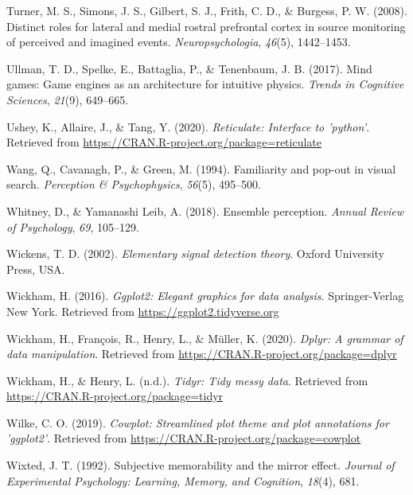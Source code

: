 \documentclass[12pt,twoside]{reedthesis}
\begin{document}
\leavevmode\hypertarget{ref-turner2008distinct}{}%
Turner, M. S., Simons, J. S., Gilbert, S. J., Frith, C. D., \& Burgess, P. W. (2008). Distinct roles for lateral and medial rostral prefrontal cortex in source monitoring of perceived and imagined events. \emph{Neuropsychologia}, \emph{46}(5), 1442--1453.

\leavevmode\hypertarget{ref-ullman2017mind}{}%
Ullman, T. D., Spelke, E., Battaglia, P., \& Tenenbaum, J. B. (2017). Mind games: Game engines as an architecture for intuitive physics. \emph{Trends in Cognitive Sciences}, \emph{21}(9), 649--665.

\leavevmode\hypertarget{ref-R-reticulate}{}%
Ushey, K., Allaire, J., \& Tang, Y. (2020). \emph{Reticulate: Interface to 'python'}. Retrieved from \url{https://CRAN.R-project.org/package=reticulate}

\leavevmode\hypertarget{ref-wang1994familiarity}{}%
Wang, Q., Cavanagh, P., \& Green, M. (1994). Familiarity and pop-out in visual search. \emph{Perception \& Psychophysics}, \emph{56}(5), 495--500.

\leavevmode\hypertarget{ref-whitney2018ensemble}{}%
Whitney, D., \& Yamanashi Leib, A. (2018). Ensemble perception. \emph{Annual Review of Psychology}, \emph{69}, 105--129.

\leavevmode\hypertarget{ref-wickens2002elementary}{}%
Wickens, T. D. (2002). \emph{Elementary signal detection theory}. Oxford University Press, USA.

\leavevmode\hypertarget{ref-R-ggplot2}{}%
Wickham, H. (2016). \emph{Ggplot2: Elegant graphics for data analysis}. Springer-Verlag New York. Retrieved from \url{https://ggplot2.tidyverse.org}

\leavevmode\hypertarget{ref-R-dplyr}{}%
Wickham, H., François, R., Henry, L., \& Müller, K. (2020). \emph{Dplyr: A grammar of data manipulation}. Retrieved from \url{https://CRAN.R-project.org/package=dplyr}

\leavevmode\hypertarget{ref-R-tidyr}{}%
Wickham, H., \& Henry, L. (n.d.). \emph{Tidyr: Tidy messy data}. Retrieved from \url{https://CRAN.R-project.org/package=tidyr}

\leavevmode\hypertarget{ref-R-cowplot}{}%
Wilke, C. O. (2019). \emph{Cowplot: Streamlined plot theme and plot annotations for 'ggplot2'}. Retrieved from \url{https://CRAN.R-project.org/package=cowplot}

\leavevmode\hypertarget{ref-wixted1992subjective}{}%
Wixted, J. T. (1992). Subjective memorability and the mirror effect. \emph{Journal of Experimental Psychology: Learning, Memory, and Cognition}, \emph{18}(4), 681.
\end{document}
